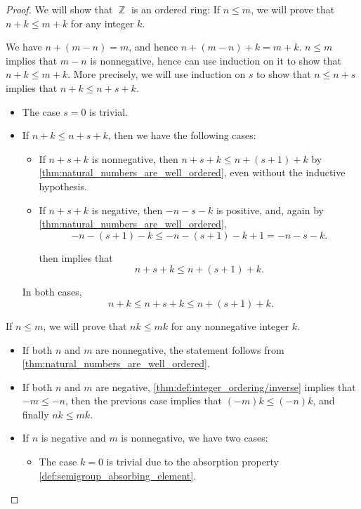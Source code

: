\begin{proof}
   We will show that \( \BbbZ \) is an ordered ring:
   If \( n \leq m \), we will prove that \( n + k \leq m + k \) for any integer \( k \).

  We have \( n + (m - n) = m \), and hence \( n + (m - n) + k = m + k \). \( n \leq m \) implies that \( m - n \) is nonnegative, hence can use induction on it to show that \( n + k \leq m + k \). More precisely, we will use induction on \( s \) to show that \( n \leq n + s \) implies that \( n + k \leq n + s + k \).

  \begin{itemize}
    \item The case \( s = 0 \) is trivial.
    \item If \( n + k \leq n + s + k \), then we have the following cases:
    \begin{itemize}
      \item If \( n + s + k \) is nonnegative, then \( n + s + k \leq n + (s + 1) + k \) by \cref{thm:natural_numbers_are_well_ordered}, even without the inductive hypothesis.
      \item If \( n + s + k \) is negative, then \( -n - s - k \) is positive, and, again by \cref{thm:natural_numbers_are_well_ordered},
      \begin{equation*}
        -n - (s + 1) - k \leq -n - (s + 1) - k + 1 = -n - s - k.
      \end{equation*}

       then implies that
      \begin{equation*}
        n + s + k \leq n + (s + 1) + k.
      \end{equation*}
    \end{itemize}

    In both cases,
    \begin{equation*}
      n + k \leq n + s + k \leq n + (s + 1) + k.
    \end{equation*}
  \end{itemize}

   If \( n \leq m \), we will prove that \( nk \leq mk \) for any nonnegative integer \( k \).

  \begin{itemize}
    \item If both \( n \) and \( m \) are nonnegative, the statement follows from \cref{thm:natural_numbers_are_well_ordered}.
    \item If both \( n \) and \( m \) are negative, \cref{thm:def:integer_ordering/inverse} implies that \( -m \leq -n \), then the previous case implies that \( (-m)k \leq (-n)k \), and finally \( nk \leq mk \).
    \item If \( n \) is negative and \( m \) is nonnegative, we have two cases:
    \begin{itemize}
      \item The case \( k = 0 \) is trivial due to the absorption property \eqref{def:semigroup_absorbing_element}.


\end{itemize}
\end{itemize}
\end{proof}
